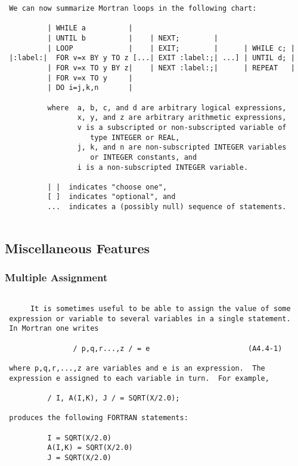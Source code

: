 \newpage \begin{verbatim}
 We can now summarize Mortran loops in the following chart:
 
          | WHILE a          |
          | UNTIL b          |    | NEXT;        |
          | LOOP             |    | EXIT;        |      | WHILE c; |
 |:label:|  FOR v=x BY y TO z [...| EXIT :label:;| ...] | UNTIL d; |
          | FOR v=x TO y BY z|    | NEXT :label:;|      | REPEAT   |
          | FOR v=x TO y     |
          | DO i=j,k,n       |
 
          where  a, b, c, and d are arbitrary logical expressions,
                 x, y, and z are arbitrary arithmetic expressions,
                 v is a subscripted or non-subscripted variable of
                    type INTEGER or REAL,
                 j, k, and n are non-subscripted INTEGER variables
                    or INTEGER constants, and
                 i is a non-subscripted INTEGER variable.
 
          | |  indicates "choose one",
          [ ]  indicates "optional", and
          ...  indicates a (possibly null) sequence of statements.
 
 \end{verbatim}
 \subsection{Miscellaneous Features}
 \subsubsection{Multiple Assignment}
 \begin{verbatim}
 
      It is sometimes useful to be able to assign the value of some
 expression or variable to several variables in a single statement.
 In Mortran one writes
 
                / p,q,r...,z / = e                       (A4.4-1)
 
 where p,q,r,...,z are variables and e is an expression.  The
 expression e assigned to each variable in turn.  For example,
 
          / I, A(I,K), J / = SQRT(X/2.0);
 
 produces the following FORTRAN statements:
 
          I = SQRT(X/2.0)
          A(I,K) = SQRT(X/2.0)
          J = SQRT(X/2.0)
 \end{verbatim}
